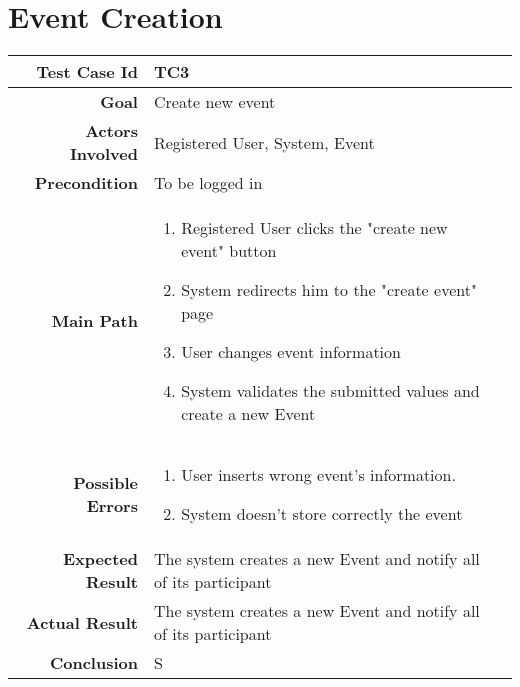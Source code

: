 \section{Event Creation}
\begin{tabularx}{\linewidth}{|r|X|X|}

  \hline   {\bf Test Case Id} &  TC3\\
  \hline  {\bf Goal} & Create new event\\
  \hline  {\bf Actors Involved} & Registered User, System, Event\\
  \hline  {\bf Precondition} & To be logged in\\ 
   \hline  {\bf Main Path} & \begin{enumerate} 
   \item Registered User clicks the "create new event" button
   \item System redirects him to the "create event" page
   \item User changes event information
    \item System validates the submitted values and create a new Event
   \end{enumerate}\\
   \hline  {\bf Possible Errors} & \begin{enumerate} 
   \item User inserts wrong event's information.
   \item System doesn't store correctly the event
   \end{enumerate}\\
  \hline  {\bf Expected Result} & The system creates a new Event and notify all of its participant\\
  \hline  {\bf Actual Result} & The system creates a new Event and notify all of its participant\\
  \hline  {\bf Conclusion} & S\\
  \hline
  
\end{tabularx}
